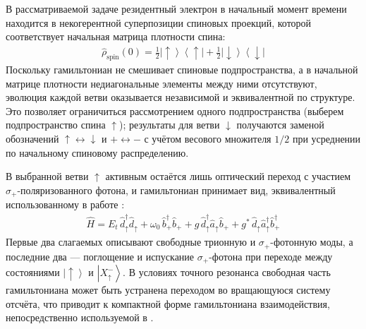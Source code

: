 \documentclass[11pt]{article}    %
\numberwithin{equation}{section}
\begin{document}
В рассматриваемой задаче резидентный электрон в начальный момент
времени находится в некогерентной суперпозиции спиновых проекций,
которой соответствует начальная матрица плотности спина:
\begin{gather}
    \hat{\rho}_{\text{spin}}(0) = \tfrac{1}{2}
    \left|\uparrow\right\rangle\!\left\langle\uparrow\right|
    + \tfrac{1}{2}
    \left|\downarrow\right\rangle\!\left\langle\downarrow\right|
\end{gather}
Поскольку гамильтониан не смешивает спиновые подпространства, а в
начальной матрице плотности недиагональные элементы между ними
отсутствуют, эволюция каждой ветви оказывается независимой и
эквивалентной по структуре. Это позволяет ограничиться рассмотрением
одного подпространства (выберем подпространство спина $\uparrow$); результаты для ветви
$\downarrow$ получаются заменой обозначений
$\uparrow \leftrightarrow \downarrow$ и $+ \leftrightarrow -$ с
учётом весового множителя $1/2$ при усреднении по начальному
спиновому распределению.

В выбранной ветви $\uparrow$ активным остаётся лишь оптический
переход с участием $\sigma_+$-поляризованного фотона, и гамильтониан
принимает вид, эквивалентный использованному в работе
\cite{krainov2025}:
\begin{gather}
    \hat{H} = E_t \, \hat{d}^{\dag}_{\uparrow} \hat{d}_{\uparrow}
    + \omega_0 \, \hat{b}^{\dag}_{+} \hat{b}_{+}
    + g \, \hat{d}^{\dag}_{\uparrow} \hat{a}_{\uparrow} \hat{b}_{+}
    + g^{*} \, \hat{d}_{\uparrow} \hat{a}^{\dag}_{\uparrow} \hat{b}^{\dag}_{+}
\end{gather}
Первые два слагаемых описывают свободные трионную и
$\sigma_+$-фотонную моды, а последние два --- поглощение и испускание
$\sigma_+$-фотона при переходе между состояниями
$\left|\uparrow\right\rangle$ и $\left|X^-_{\uparrow}\right\rangle$.
В условиях точного резонанса свободная часть гамильтониана может
быть устранена переходом во вращающуюся систему отсчёта, что
приводит к компактной форме гамильтониана взаимодействия,
непосредственно используемой в \cite{krainov2025}.
\end{document}
